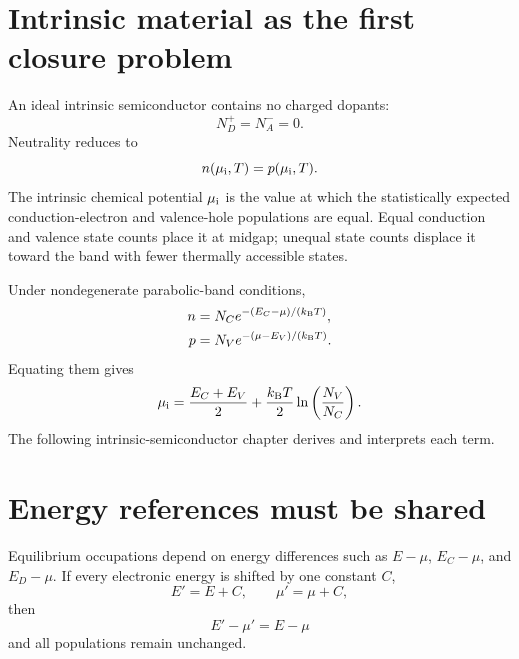 \section{Intrinsic material as the first closure problem}

An ideal intrinsic semiconductor contains no charged dopants:
\begin{equation}
  N_D^+=N_A^-=0.
  \label{eq:no-ionized-dopants-intrinsic}
\end{equation}
Neutrality reduces to
\begin{equation}
  n(\mu_{\mathrm i},T)=p(\mu_{\mathrm i},T).
  \label{eq:chemical-potential-intrinsic-neutrality}
\end{equation}
The intrinsic chemical potential $\mu_{\mathrm i}$ is the value at which the statistically
expected conduction-electron and valence-hole populations are equal.  Equal
conduction and valence state counts place it at midgap; unequal state counts
displace it toward the band with fewer thermally accessible states.

Under nondegenerate parabolic-band conditions,
\begin{align}
  n&=N_Ce^{-(E_C-\mu)/(k_{\mathrm B} T)},
  \label{eq:chemical-potential-boltzmann-electrons}\\
  p&=N_Ve^{-(\mu-E_V)/(k_{\mathrm B} T)}.
  \label{eq:chemical-potential-boltzmann-holes}
\end{align}
Equating them gives
\begin{equation}
  \mu_{\mathrm i}
  =\frac{E_C+E_V}{2}
   +\frac{k_{\mathrm B} T}{2}\ln\left(\frac{N_V}{N_C}\right).
  \label{eq:chemical-potential-intrinsic-result-preview}
\end{equation}
The following intrinsic-semiconductor chapter derives and interprets each term.

\section{Energy references must be shared}

Equilibrium occupations depend on energy differences such as $E-\mu$,
$E_C-\mu$, and $E_D-\mu$.  If every electronic energy is shifted by one
constant $C$,
\begin{equation}
  E' = E+C,
  \qquad
  \mu'=\mu+C,
  \label{eq:chemical-potential-rigid-energy-shift}
\end{equation}
then
\begin{equation}
  E'-\mu'=E-\mu
  \label{eq:chemical-potential-energy-difference-invariance}
\end{equation}
and all populations remain unchanged.

